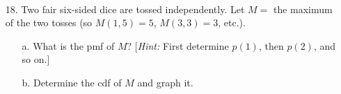 \documentclass[letterpaper,12pt]{article}
\begin{document}
\begin{enumerate}
\begin{enumerate}
\begin{align*}
        \end{align*}
      \end{enumerate}
  \item[18.]
    Two fair six-sided dice are tossed independently. Let $M =$ the maximum of the two tosses (so $M(1,5) = 5$, $M(3,3) = 3$, etc.).
    \begin{enumerate}
      \item[a.]
        What is the pmf of $M$? [\textit{Hint:} First determine $p(1)$, then $p(2)$, and so on.]
      \item[b.]
        Determine the cdf of $M$ and graph it.
    \end{enumerate}
\end{enumerate}
\end{document}
